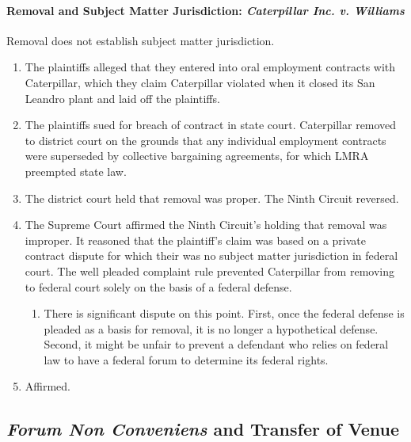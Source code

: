 \paragraph{Removal and Subject Matter Jurisdiction: \emph{Caterpillar Inc. v. Williams}}

Removal does not establish subject matter jurisdiction.

\begin{enumerate}
    \item The plaintiffs alleged that they entered into oral employment 
    contracts with Caterpillar, which they claim Caterpillar violated when it 
    closed its San Leandro plant and laid off the plaintiffs.
    \item The plaintiffs sued for breach of contract in state court. 
    Caterpillar removed to district court on the grounds that any individual 
    employment contracts were superseded by collective bargaining agreements, 
    for which LMRA preempted state law.
    \item The district court held that removal was proper. The Ninth Circuit 
    reversed.
    \item The Supreme Court affirmed the Ninth Circuit's holding that removal 
    was improper. It reasoned that the plaintiff's claim was based on a 
    private contract dispute for which their was no subject matter 
    jurisdiction in federal court. The well pleaded complaint rule prevented 
    Caterpillar from removing to federal court solely on the basis of a 
    federal defense.
    \begin{enumerate}
        \item There is significant dispute on this point. First, once the 
        federal defense is pleaded as a basis for removal, it is no longer a 
        hypothetical defense. Second, it might be unfair to prevent a 
        defendant who relies on federal law to have a federal forum to 
        determine its federal rights.
    \end{enumerate}
    \item Affirmed.
\end{enumerate}

\subsection{\emph{Forum Non Conveniens} and Transfer of Venue}

